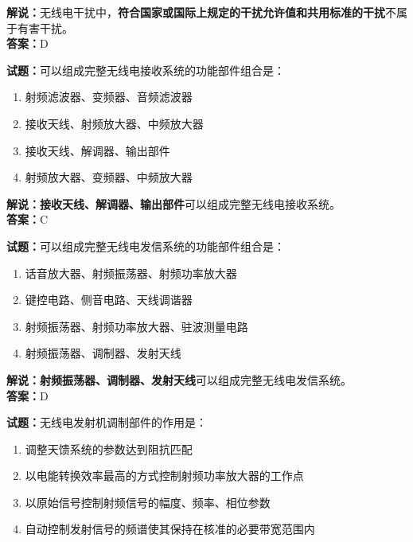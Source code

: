 \documentclass{ctexbook}
\begin{document}
\noindent\textbf{解说：}无线电干扰中，\textbf{符合国家或国际上规定的干扰允许值和共用标准的干扰}不属于有害干扰。\\\noindent\textbf{答案：}D

\bigskip

\noindent\textbf{试题：}可以组成完整无线电接收系统的功能部件组合是：

\begin{enumerate}[leftmargin=3em]
  \item 射频滤波器、变频器、音频滤波器
  \item 接收天线、射频放大器、中频放大器
  \item 接收天线、解调器、输出部件
  \item 射频放大器、变频器、中频放大器
\end{enumerate}

\noindent\textbf{解说：}\textbf{接收天线、解调器、输出部件}可以组成完整无线电接收系统。\\\noindent\textbf{答案：}C

\bigskip

\noindent\textbf{试题：}可以组成完整无线电发信系统的功能部件组合是：

\begin{enumerate}[leftmargin=3em]
  \item 话音放大器、射频振荡器、射频功率放大器
  \item 键控电路、侧音电路、天线调谐器
  \item 射频振荡器、射频功率放大器、驻波测量电路
  \item 射频振荡器、调制器、发射天线
\end{enumerate}

\noindent\textbf{解说：}\textbf{射频振荡器、调制器、发射天线}可以组成完整无线电发信系统。\\\noindent\textbf{答案：}D%

\bigskip

\noindent\textbf{试题：}无线电发射机调制部件的作用是：

\begin{enumerate}[leftmargin=3em]
  \item 调整天馈系统的参数达到阻抗匹配
  \item 以电能转换效率最高的方式控制射频功率放大器的工作点
  \item 以原始信号控制射频信号的幅度、频率、相位参数
  \item 自动控制发射信号的频谱使其保持在核准的必要带宽范围内
\end{enumerate}
\end{document}
